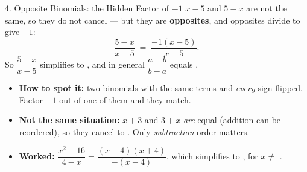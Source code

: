 \documentclass[10pt]{article}
\begin{document}
\begin{notesbox}{4. Opposite Binomials: the Hidden Factor of $-1$}
$x-5$ and $5-x$ are not the same, so they do not cancel --- but they are \textbf{opposites}, and
opposites divide to give $-1$:
\[
  \frac{5-x}{x-5} \;=\; \frac{-1(x-5)}{x-5} .
\]
So $\dfrac{5-x}{x-5}$ simplifies to \blank{1.2cm}, and in general $\dfrac{a-b}{b-a}$ equals
\blank{1.2cm}.
\begin{itemize}[leftmargin=1.5em, itemsep=3pt]
  \item \textbf{How to spot it:} two binomials with the same terms and \emph{every} sign flipped.
        Factor $-1$ out of one of them and they match.
  \item \textbf{Not the same situation:} $x+3$ and $3+x$ \emph{are} equal (addition can be reordered),
        so they cancel to \blank{0.8cm}. Only \emph{subtraction} order matters.
  \item \textbf{Worked:} $\dfrac{x^2-16}{4-x}=\dfrac{(x-4)(x+4)}{-(x-4)}$, which simplifies to
        \blank{2.4cm}, \; for $x\neq$ \blank{0.8cm}.
\end{itemize}
\end{notesbox}
\end{document}
